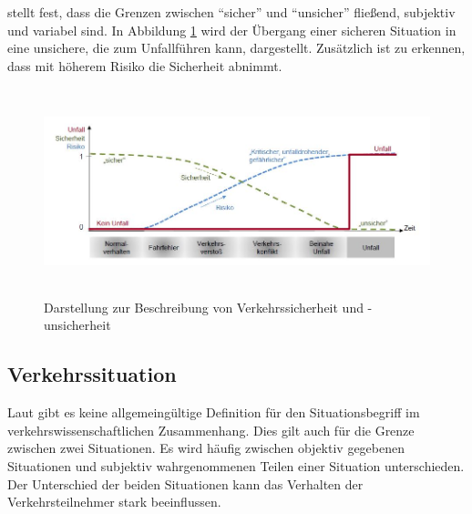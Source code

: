 \Textcite[S. 10]{Hoffmann.26.04.2013} stellt fest, dass die Grenzen  zwischen \enquote{sicher} und \enquote{unsicher} fließend, subjektiv und variabel sind. In Abbildung \ref{fig:sicher_unsicher} wird der Übergang einer sicheren Situation in eine unsichere, die zum Unfallführen kann, dargestellt. Zusätzlich ist zu erkennen, dass mit höherem Risiko die Sicherheit abnimmt. 

\begin{savenotes}
	\begin{figure}[H]
		\centering
		\includegraphics[width=14cm,height=6cm]{figures/sicher_unsicher}
		\caption[Darstellung zur Beschreibung von Verkehrssicherheit und -unsicherheit]{Darstellung zur Beschreibung von Verkehrssicherheit und -unsicherheit \parencite[S. 10]{Hoffmann.26.04.2013}}\label{fig:sicher_unsicher}
	\end{figure}
\end{savenotes}

\subsection{Verkehrssituation}
Laut \Textcite[S. 6-8]{Hoffmann.26.04.2013} gibt es keine allgemeingültige Definition für den Situationsbegriff im verkehrswissenschaftlichen Zusammenhang. Dies gilt auch für die Grenze zwischen zwei Situationen. Es wird häufig zwischen objektiv gegebenen Situationen und subjektiv wahrgenommenen Teilen einer Situation unterschieden. Der Unterschied der beiden Situationen kann das Verhalten der Verkehrsteilnehmer stark beeinflussen.

